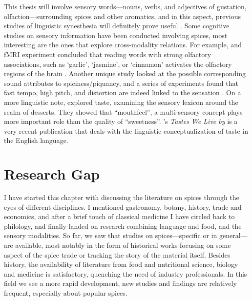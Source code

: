 This thesis will involve sensory words---nouns, verbs, and adjectives of gustation, olfaction---surrounding spices and other aromatics, and in this aspect, previous studies of linguistic synesthesia will definitely prove useful \autocites[see][]{huang_linguistic_2019}{zhao_directionality_2019}. Some cognitive studies on sensory information have been conducted involving spices, most interesting are the ones that explore cross-modality relations. For example, and fMRI experiment concluded that reading words with strong olfactory associations, such as `garlic', `jasmine', or `cinnamon' activates the olfactory regions of the brain \autocite{gonzalez_reading_2006}. Another unique study looked at the possible corresponding sound attributes to spiciness/piquancy, and a series of experiments found that fast tempo, high pitch, and distortion are indeed linked to the sensation \autocite{wang_sounds_2017}. On a more linguistic note,  \textcite{zhong_sweetness_2020} explored taste, examining the sensory lexicon around the realm of desserts. They showed that ``mouthfeel'', a multi-sensory concept plays more important role than the quality of ``sweetness''. \textcite{bagli_tastes_2021}'s \textit{Tastes We Live by} is a very recent publication that deals with the linguistic conceptualization of taste in the English language.

\section{Research Gap}
\label{sec:research_gap}

I have started this chapter with discussing the literature on spices through the eyes of different disciplines. I mentioned gastronomy, botany, history, trade and economics, and after a brief touch of classical medicine I have circled back to philology, and finally landed on research combining language and food, and the sensory modalities. So far, we saw that studies on spices---specific or in general---are available, most notably in the form of historical works focusing on some aspect of the spice trade or tracking the story of the material itself. Besides history, the availability of literature from food and nutritional science, biology and medicine is satisfactory, quenching the need of industry professionals. In this field we see a more rapid development, new studies and findings are relatively frequent, especially about popular spices. 

